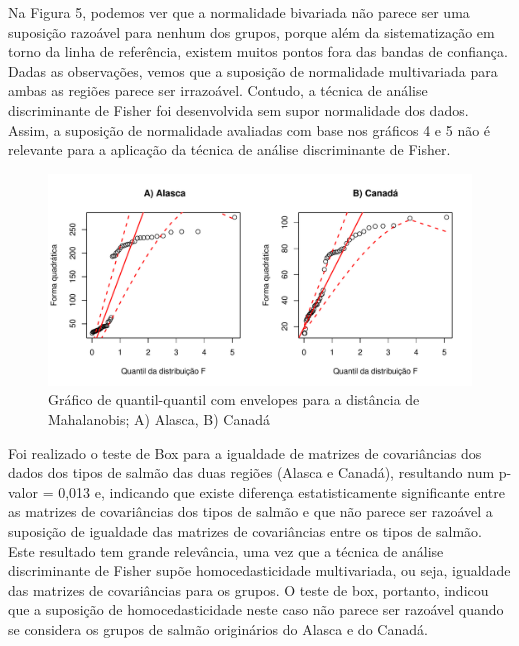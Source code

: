 \documentclass[10pt,portuguese,]{article}
\begin{document}
Na Figura 5, podemos ver que a normalidade bivariada não parece ser uma
suposição razoável para nenhum dos grupos, porque além da sistematização
em torno da linha de referência, existem muitos pontos fora das bandas
de confiança. Dadas as observações, vemos que a suposição de normalidade
multivariada para ambas as regiões parece ser irrazoável. Contudo, a
técnica de análise discriminante de Fisher foi desenvolvida sem supor
normalidade dos dados. Assim, a suposição de normalidade avaliadas com
base nos gráficos 4 e 5 não é relevante para a aplicação da técnica de
análise discriminante de Fisher.

\vspace{0.5cm}

\begin{figure}[!h]

{\centering \includegraphics{RELATORIO_FINAL_FORMATADO_files/figure-latex/unnamed-chunk-14-1} 

}

\caption{Gráfico de quantil-quantil com envelopes para a distância de Mahalanobis; A) Alasca, B) Canadá}\label{fig:unnamed-chunk-14}
\end{figure}

\vspace{0.5cm}

Foi realizado o teste de Box para a igualdade de matrizes de
covariâncias dos dados dos tipos de salmão das duas regiões (Alasca e
Canadá), resultando num p-valor = 0,013 e, indicando que existe
diferença estatisticamente significante entre as matrizes de
covariâncias dos tipos de salmão e que não parece ser razoável a
suposição de igualdade das matrizes de covariâncias entre os tipos de
salmão. Este resultado tem grande relevância, uma vez que a técnica de
análise discriminante de Fisher supõe homocedasticidade multivariada, ou
seja, igualdade das matrizes de covariâncias para os grupos. O teste de
box, portanto, indicou que a suposição de homocedasticidade neste caso
não parece ser razoável quando se considera os grupos de salmão
originários do Alasca e do Canadá.
\end{document}
